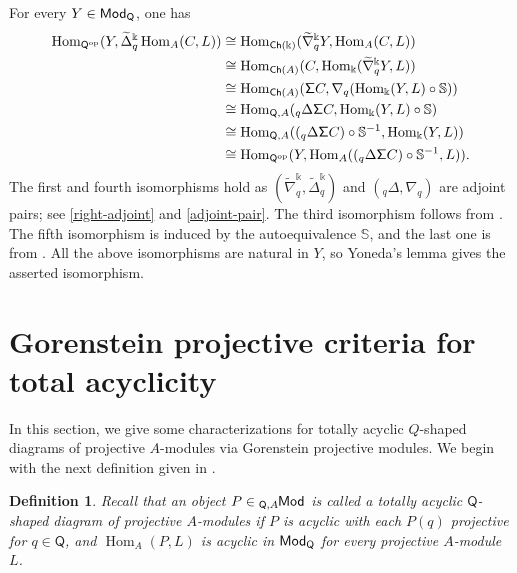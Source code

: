 \documentclass{amsart}
\theoremstyle{bfupright head,slanted body}
\theoremstyle{bfupright head,upright body}
\theoremstyle{fixed bf head,slanted body}
\theoremstyle{fixed bf head,upright body}
\newtheorem{dfn}[res]{Definition}       \newtheorem*{dfn*}{Definition}
\theoremstyle{numbered paragraph}
\newenvironment{prf*}[1][Proof]{%
	\begin{proof}[\bf #1]
		\setcounter{equation}{0}
		\renewcommand{\theequation}{\arabic{equation}}}
	{\end{proof}
}
\numberwithin{equation}{res}
\newcommand{\ch}[1]{\mathsf{Ch}(#1)}
\newcommand{\Hom}{\operatorname{Hom}}
\newcommand{\Q}{\mathsf{Q}}
\newcommand{\kk}{\Bbbk}
\newcommand{\lMod}[1]{{}_{#1}\mspace{-1mu}{\sf{Mod}}}
\newcommand{\rMod}[1]{{\sf{Mod}}_{#1}}
\begin{document}
\begin{prf*}
For every $Y\in\rMod{\Q}$, one has
\begin{align*}
\Hom_{\Q^{\mathrm{op}}}(Y,\widetilde{\Delta}_q^{\kk}\Hom_A(C,L))
&\cong \Hom_{\ch\kk}(\widetilde{\nabla}_q^{\kk}Y,\Hom_A(C,L)) \\
&\cong \Hom_{\ch A}(C,\Hom_{\kk}(\widetilde{\nabla}_q^{\kk}Y,L))\\
&\cong \Hom_{\ch A}({\sf\Sigma} C, \nabla_q(\Hom_{\kk}(Y,L)\circ\mathbb S)) \\
&\cong \Hom_{\Q,A}({}_q\Delta{\sf\Sigma} C, \Hom_{\kk}(Y,L)\circ\mathbb S)\\
&\cong \Hom_{\Q,A}(({}_q\Delta{\sf\Sigma} C)\circ\mathbb S^{-1},\Hom_{\kk}(Y,L))\\
&\cong \Hom_{\Q^{\mathrm{op}}}(Y, \Hom_A(({}_q\Delta{\sf\Sigma} C)\circ\mathbb S^{-1},L)).
\end{align*}
The first and fourth isomorphisms hold as $(\widetilde{\nabla}_q^{\kk}, \widetilde{\Delta}_q^{\kk})$ and $({}_q\Delta, \nabla_q)$ are adjoint pairs; see \ref{right-adjoint} and \ref{adjoint-pair}. The third isomorphism follows from \cite[Lemma 3.6$(iv)$]{HJ26}. The fifth isomorphism is induced by the autoequivalence $\mathbb S$, and the last one is from \cite[Remark 1.4]{HJ26}. All the above isomorphisms are natural in $Y$, so Yoneda's lemma gives the asserted isomorphism.
\end{prf*}

\section{Gorenstein projective criteria for total acyclicity}\label{sec:adjoint-triple}
\noindent
In this section, we give some characterizations for totally acyclic $Q$-shaped diagrams of projective $A$-modules via Gorenstein projective modules. We begin with the next definition given in \cite{HJ26}.

\begin{dfn}\label{dfn:totally-acyclic}
Recall that an object $P\in\lMod{\Q,A}$ is called a \emph{totally acyclic} $\Q$-shaped diagram of projective $A$-modules if $P$ is acyclic with each $P(q)$ projective for $q\in\Q$, and $\Hom_A(P,L)$ is acyclic in $\rMod{\Q}$ for every projective $A$-module $L$.
\end{dfn}
\end{document}
